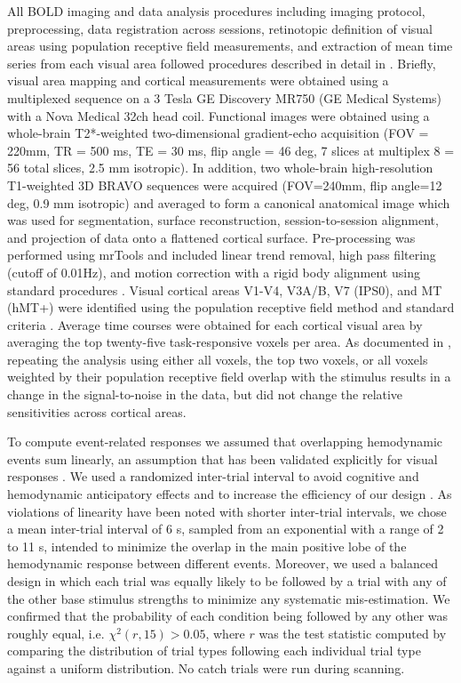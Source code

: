 All BOLD imaging and data analysis procedures including imaging protocol, preprocessing, data registration across sessions, retinotopic definition of visual areas using population receptive field measurements, and extraction of mean time series from each visual area followed procedures described in detail in \citet{Birman2018-sp}. Briefly, visual area mapping and cortical measurements were obtained using a multiplexed sequence on a 3 Tesla GE Discovery MR750 (GE Medical Systems) with a Nova Medical 32ch head coil. Functional images were obtained using a whole-brain T2*-weighted two-dimensional gradient-echo acquisition (FOV = 220mm, TR = 500 ms, TE = 30 ms, flip angle = 46 deg, 7 slices at multiplex 8 = 56 total slices, 2.5 mm isotropic). In addition, two whole-brain high-resolution T1-weighted 3D BRAVO sequences were acquired (FOV=240mm, flip angle=12 deg, 0.9 mm isotropic) and averaged to form a canonical anatomical image which was used for segmentation, surface reconstruction, session-to-session alignment, and projection of data onto a flattened cortical surface. Pre-processing was performed using mrTools \citep{Gardner2018-hf} and included linear trend removal, high pass filtering (cutoff of 0.01Hz), and motion correction with a rigid body alignment using standard procedures \citep{Gardner2008-yx}. Visual cortical areas V1-V4, V3A/B, V7 (IPS0), and MT (hMT+) were identified using the population receptive field method \citep{Dumoulin2008-uc} and standard criteria \citep{Wandell2007-pr}. Average time courses were obtained for each cortical visual area by averaging the top twenty-five task-responsive voxels per area. As documented in \citet{Birman2018-sp}, repeating the analysis using either all voxels, the top two voxels, or all voxels weighted by their population receptive field overlap with the stimulus results in a change in the signal-to-noise in the data, but did not change the relative sensitivities across cortical areas. 

To compute event-related responses we assumed that overlapping hemodynamic events sum linearly, an assumption that has been validated explicitly for visual responses \citep{Boynton1996-ff,Dale1997-ur}. We used a randomized inter-trial interval to avoid cognitive \citep{Zarahn1997-jc} and hemodynamic \citep{Sirotin2009-da} anticipatory effects and to increase the efficiency of our design \citep{Dale1999-oq,Liu2004-qy}. As violations of linearity have been noted with shorter inter-trial intervals, we chose a mean inter-trial interval of 6 s, sampled from an exponential with a range of 2 to 11 s, intended to minimize the overlap in the main positive lobe of the hemodynamic response between different events. Moreover, we used a balanced design in which each trial was equally likely to be followed by a trial with any of the other base stimulus strengths to minimize any systematic mis-estimation. We confirmed that the probability of each condition being followed by any other was roughly equal, i.e. $\chi^2(r,15)>0.05$, where $r$ was the test statistic computed by comparing the distribution of trial types following each individual trial type against a uniform distribution. No catch trials were run during scanning.

